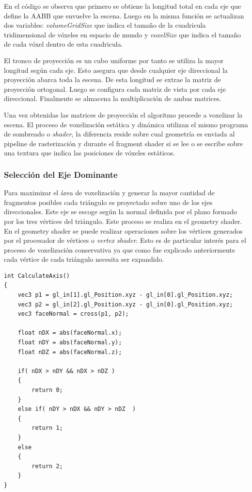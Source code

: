 En el código se observa que primero se obtiene la longitud total en cada eje que define la \ac{AABB} que envuelve la escena. Luego en la misma función se actualizan dos variables: \emph{volumeGridSize} que indica el tamaño de la cuadricula tridimensional de vóxeles en espacio de mundo y \emph{voxelSize} que indica el tamaño de cada vóxel dentro de esta cuadricula. 

El tronco de proyección es un cubo uniforme por tanto se utiliza la mayor longitud según cada eje. Esto asegura que desde cualquier eje direccional la proyección abarca toda la escena. De esta longitud se extrae la matriz de proyección ortogonal. Luego se configura cada matriz de vista por cada eje direccional. Finalmente se almacena la multiplicación de ambas matrices.

Una vez obtenidas las matrices de proyección el algoritmo procede a voxelizar la escena. El proceso de voxelización estática y dinámica utilizan el mismo programa de sombreado o \emph{shader}, la diferencia reside sobre cual geometría es enviada al pipeline de rasterización y durante el fragment shader si se lee o se escribe sobre una textura que indica las posiciones de vóxeles estáticos.

\subsubsection{Selección del Eje Dominante}
Para maximizar el área de voxelización y generar la mayor cantidad de fragmentos posibles cada triángulo es proyectado sobre uno de los ejes direccionales. Este eje se escoge según la normal definida por el plano formado por los tres vértices del triángulo. Este proceso se realiza en el geometry shader. En el geometry shader se puede realizar operaciones sobre los vértices generados por el procesador de vértices o \emph{vertex shader}. Esto es de particular interés para el proceso de voxelización conservativa ya que como fue explicado anteriormente cada vértice de cada triángulo necesita ser expandido.
\\
\begin{lstlisting}[caption={Selección del eje dominante para la proyección ortogonal.}, label=CalculateAxis]
int CalculateAxis()
{
	vec3 p1 = gl_in[1].gl_Position.xyz - gl_in[0].gl_Position.xyz;
	vec3 p2 = gl_in[2].gl_Position.xyz - gl_in[0].gl_Position.xyz;
	vec3 faceNormal = cross(p1, p2);

	float nDX = abs(faceNormal.x);
	float nDY = abs(faceNormal.y);
	float nDZ = abs(faceNormal.z);

	if( nDX > nDY && nDX > nDZ )
    {
		return 0;
	}
	else if( nDY > nDX && nDY > nDZ  )
    {
	    return 1;
    }
	else
    {
	    return 2;
	}
}
\end{lstlisting}

